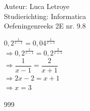 \documentclass[a4paper]{article}
\begin{document}
  
\noindent \large Auteur: Luca Letroye        \\
\noindent \large Studierichting: Informatica \\
\noindent \large Oefeningenreeks 2E nr. 9.8\\

\medskip

\normalsize

$0,2^{\tfrac{1}{x-1}} = 0,04^{\tfrac{1}{x+1}}$\\

$\Rightarrow 0,2^{\tfrac{1}{x-1}} = 0,2^{\tfrac{2}{x+1}}$\\

$\Rightarrow \dfrac{1}{x-1} = \dfrac{2}{x+1}$\\

$\Rightarrow 2x-2 = x+1$\\

$\Rightarrow x = 3$\\


\begin{thebibliography}{999}
\end{thebibliography}
\end{document}
